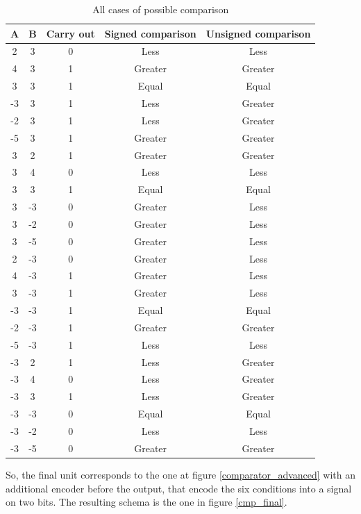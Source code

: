 \begin{table}[H]
  \centering
  \begin{tabular}{c|c|c|c|c}
      \textbf{A} & \textbf{B} & \textbf{Carry out} & \textbf{Signed comparison} & \textbf{Unsigned comparison} \\
      \hline
      2 & 3 & 0 & Less & Less \\
      4 & 3 & 1 & Greater & Greater \\
      3 & 3 & 1 & Equal & Equal \\
      \rowcolor{red!50}
      -3 & 3 & 1 & Less & Greater \\
      \rowcolor{red!50}
      -2 & 3 & 1 & Less & Greater \\
      \rowcolor{red!50}
      -5 & 3 & 1 & Greater & Greater \\
      \hline
      3 & 2 & 1 & Greater & Greater \\
      3 & 4 & 0 & Less & Less \\
      3 & 3 & 1 & Equal & Equal \\
      \rowcolor{red!50}
      3 & -3 & 0 & Greater & Less \\
      \rowcolor{red!50}
      3 & -2 & 0 & Greater & Less \\
      \rowcolor{red!50}
      3 & -5 & 0 & Greater & Less \\
      \hline
      \rowcolor{red!50}
      2 & -3 & 0 & Greater & Less \\
      \rowcolor{red!50}
      4 & -3 & 1 & Greater & Less \\
      \rowcolor{red!50}
      3 & -3 & 1 & Greater & Less \\
      -3 & -3 & 1 & Equal & Equal \\
      -2 & -3 & 1 & Greater & Greater \\
      -5 & -3 & 1 & Less & Less \\
      \hline
      \rowcolor{red!50}
      -3 & 2 & 1 & Less & Greater \\
      \rowcolor{red!50}
      -3 & 4 & 0 & Less & Greater \\
      \rowcolor{red!50}
      -3 & 3 & 1 & Less & Greater \\
      -3 & -3 & 0 & Equal & Equal \\
      -3 & -2 & 0 & Less & Less \\
      -3 & -5 & 0 & Greater & Greater \\
  \end{tabular}
  \caption{All cases of possible comparison}
  \label{comparator_cases}
\end{table}
So, the final unit corresponds to the one at figure \ref{comparator_advanced} with an additional encoder before the output, that encode the six conditions into a signal on two bits. The resulting schema is the one in figure \ref{cmp_final}.

